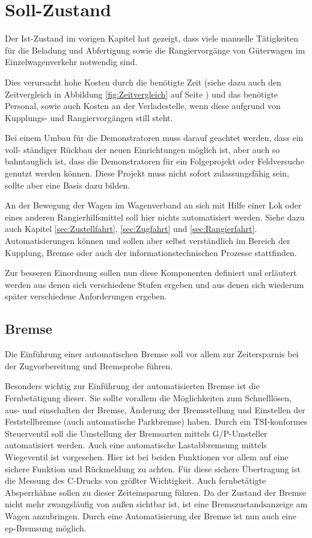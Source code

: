 \section{Soll-Zustand}
Der Ist-Zustand im vorigen Kapitel hat gezeigt, dass viele manuelle Tätigkeiten für die Beladung und Abfertigung sowie die Rangiervorgänge von Güterwagen im Einzelwagenverkehr notwendig sind.\par
Dies verursacht hohe Kosten durch die benötigte Zeit (siehe dazu auch den Zeitvergleich in Abbildung \ref{fig:Zeitvergleich} auf Seite \pageref{fig:Zeitvergleich}) und das benötigte Personal, sowie auch Kosten an der Verladestelle, wenn diese aufgrund von Kupplungs- und Rangiervorgängen still steht.\par
Bei einem Umbau für die Demonstratoren muss darauf geachtet werden, dass ein voll- ständiger Rückbau der neuen Einrichtungen möglich ist, aber auch so bahntauglich ist, dass die Demonstratoren für ein Folgeprojekt oder Feldversuche genutzt werden können. Diese Projekt muss nicht sofort zulassungsfähig sein, sollte aber eine Basis dazu bilden. \par
An der Bewegung der Wagen im Wagenverband an sich mit Hilfe einer Lok oder eines anderen Rangierhilfsmittel soll hier nichts automatisiert werden. Siehe dazu auch Kapitel \ref{sec:Zustellfahrt}, \ref{sec:Zugfahrt} und \ref{sec:Rangierfahrt}. Automatisierungen können und sollen aber selbst verständlich im Bereich der Kupplung, Bremse oder auch der informationstechnischen Prozesse stattfinden.\par
Zur besseren Einordnung sollen nun diese Komponenten definiert und erläutert werden aus denen sich verschiedene Stufen ergeben und aus denen sich wiederum später verschiedene Anforderungen ergeben.

\subsection{Bremse}
Die Einführung einer automatischen Bremse soll vor allem zur Zeitersparnis bei der Zugvorbereitung und Bremsprobe führen.\par
Besonders wichtig zur Einführung der automatisierten Bremse ist die Fernbetätigung dieser. Sie sollte vorallem die Möglichkeiten zum Schnelllösen, aus- und einschalten der Bremse, Änderung der Bremsstellung und Einstellen der Feststellbremse (auch automatische Parkbremse) haben.
Durch ein TSI-konformes Steuerventil soll die Umstellung der Bremsarten mittels G/P-Umsteller automatisiert werden. Auch eine automatische Lastabbremsung mittels Wiegeventil ist vorgesehen. Hier ist bei beiden Funktionen vor allem auf eine sichere Funktion und Rückmeldung zu achten.
Für diese sichere Übertragung ist die Messung des C-Drucks von größter Wichtigkeit.
Auch fernbetätigte Absperrhähne sollen zu dieser Zeiteinsparung führen. 
Da der Zustand der Bremse nicht mehr zwangsläufig von außen sichtbar ist, ist eine Bremszustandsanzeige am Wagen anzubringen. 
Durch eine Automatisierung der Bremse ist nun auch eine ep-Bremsung möglich.

